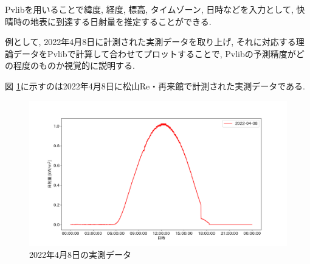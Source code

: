 \documentclass[a4j,12pt,]{jarticle}
\begin{document}
Pvlibを用いることで緯度, 経度, 標高, タイムゾーン, 日時などを入力として, 快晴時の地表に到達する日射量を推定することができる.

例として, 2022年4月8日に計測された実測データを取り上げ, それに対応する理論データをPvlibで計算して合わせてプロットすることで, Pvlibの予測精度がどの程度のものか視覚的に説明する.




図 \ref{p2}に示すのは2022年4月8日に松山Re・再来館で計測された実測データである.

\begin{figure}[H]
  \begin{center}
    \includegraphics[width=160mm]{real.png}
    \caption{2022年4月8日の実測データ}
    \label{p2}
  \end{center}
\end{figure}
\end{document}
